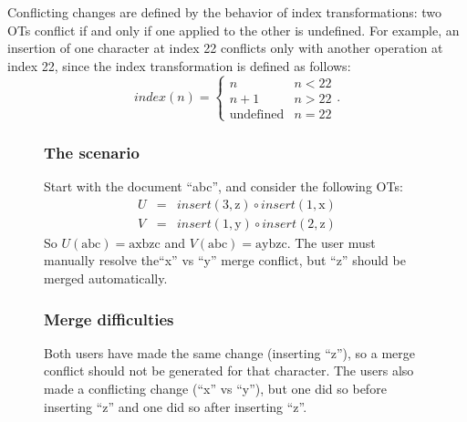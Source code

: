 \documentclass[11pt,titlepage]{article}
\begin{document}
Conflicting changes are defined by the behavior of index
transformations: two OTs conflict if and only if one applied to the
other is undefined.  For example, an insertion of one character at
index 22 conflicts only with another operation at index 22, since the
index transformation is defined as follows:
\[ index(n) = \begin{cases} n & n < 22 \\ n+1 & n > 22 \\
  \text{undefined} & n = 22 \end{cases}. \]

\begin{figure}[ht]
  \centering
  \begin{minipage}{\textwidth}
    \begin{multicols}{2}
      \subsubsection*{The scenario}
      Start with the document ``abc'', and consider the following OTs:
      \begin{eqnarray*}
        U &=& insert(3, \mathrm{z}) \circ insert(1, \mathrm{x}) \\
        V &=& insert(1, \mathrm{y}) \circ insert(2, \mathrm{z})
      \end{eqnarray*}
      So \(U(\mathrm{abc}) = \mathrm{axbzc}\) and \(V(\mathrm{abc}) =
      \mathrm{aybzc}\).  The user must manually resolve the``x'' vs
      ``y'' merge conflict, but ``z'' should be merged automatically.
      \subsubsection*{Merge difficulties}
      Both users have made the same change (inserting ``z''), so a
      merge conflict should not be generated for that character.  The
      users also made a conflicting change (``x'' vs ``y''), but one
      did so before inserting ``z'' and one did so after inserting
      ``z''.

\end{multicols}
\end{minipage}
\end{figure}
\end{document}
